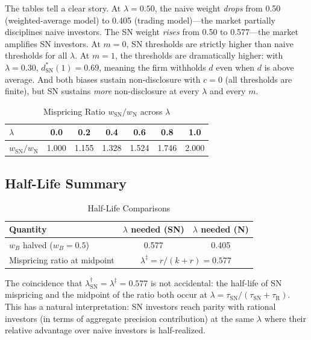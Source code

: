 \documentclass[12pt]{article}
\theoremstyle{plain}
\theoremstyle{definition}
\newcommand{\R}{\mathrm{R}}
\newcommand{\SN}{\mathrm{SN}}
\newcommand{\N}{\mathrm{N}}
\begin{document}
The tables tell a clear story. At $\lambda = 0.50$, the naive weight \emph{drops} from 0.50 (weighted-average model) to 0.405 (trading model)---the market partially disciplines naive investors. The SN weight \emph{rises} from 0.50 to 0.577---the market amplifies SN investors. At $m = 0$, SN thresholds are strictly higher than naive thresholds for all $\lambda$. At $m = 1$, the thresholds are dramatically higher: with $\lambda = 0.30$, $d^*_\SN(1) = 0.69$, meaning the firm withholds $d$ even when $d$ is above average. And both biases sustain non-disclosure with $c = 0$ (all thresholds are finite), but SN sustains \emph{more} non-disclosure at every $\lambda$ and every $m$.

\begin{table}[h!]
\centering
\caption{Mispricing Ratio $w_\SN/w_\N$ across $\lambda$}
\label{tab:ratio}
\begin{tabular}{lcccccc}
\toprule
$\lambda$ & 0.0 & 0.2 & 0.4 & 0.6 & 0.8 & 1.0 \\
\midrule
$w_\SN/w_\N$ & 1.000 & 1.155 & 1.328 & 1.524 & 1.746 & 2.000 \\
\bottomrule
\end{tabular}
\end{table}


\subsection{Half-Life Summary}

\begin{table}[h!]
\centering
\caption{Half-Life Comparisons}
\label{tab:half_life}
\begin{tabular}{lcc}
\toprule
Quantity & $\lambda$ needed (SN) & $\lambda$ needed (N) \\
\midrule
$w_B$ halved ($w_B = 0.5$) & 0.577 & 0.405 \\
Mispricing ratio at midpoint & \multicolumn{2}{c}{$\lambda^{\ddagger} = r/(k+r) = 0.577$} \\
\bottomrule
\end{tabular}
\end{table}

The coincidence that $\lambda^\dagger_\SN = \lambda^{\ddagger} = 0.577$ is not accidental: the half-life of SN mispricing and the midpoint of the ratio both occur at $\lambda = \tau_\SN/(\tau_\SN + \tau_\R)$. This has a natural interpretation: SN investors reach parity with rational investors (in terms of aggregate precision contribution) at the same $\lambda$ where their relative advantage over naive investors is half-realized.
\end{document}
